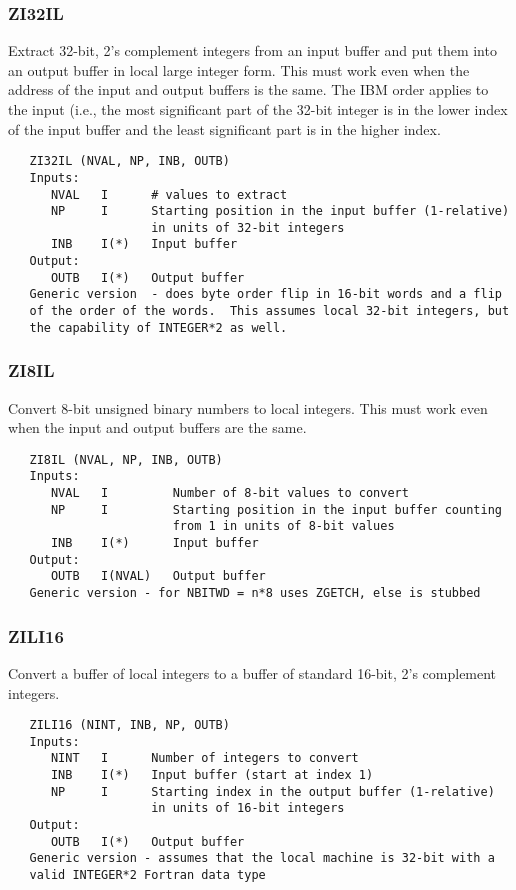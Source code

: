 \subsubsection{ZI32IL}
Extract 32-bit, 2's complement integers from an input buffer and put
them into an output buffer in local large integer form.  This must
work even when the address of the input and output buffers is the
same.  The IBM order applies to the input (i.e., the most
significant part of the 32-bit integer is in the lower index of the
input buffer and the least significant part is in the higher index.
\begin{verbatim}
   ZI32IL (NVAL, NP, INB, OUTB)
   Inputs:
      NVAL   I      # values to extract
      NP     I      Starting position in the input buffer (1-relative)
                    in units of 32-bit integers
      INB    I(*)   Input buffer
   Output:
      OUTB   I(*)   Output buffer
   Generic version  - does byte order flip in 16-bit words and a flip
   of the order of the words.  This assumes local 32-bit integers, but
   the capability of INTEGER*2 as well.
\end{verbatim}

\subsubsection{ZI8IL}
Convert 8-bit unsigned binary numbers to local integers.  This must
work even when the input and output buffers are the same.
\begin{verbatim}
   ZI8IL (NVAL, NP, INB, OUTB)
   Inputs:
      NVAL   I         Number of 8-bit values to convert
      NP     I         Starting position in the input buffer counting
                       from 1 in units of 8-bit values
      INB    I(*)      Input buffer
   Output:
      OUTB   I(NVAL)   Output buffer
   Generic version - for NBITWD = n*8 uses ZGETCH, else is stubbed
\end{verbatim}

\subsubsection{ZILI16}
Convert a buffer of local integers to a buffer of standard 16-bit,
2's complement integers.
\begin{verbatim}
   ZILI16 (NINT, INB, NP, OUTB)
   Inputs:
      NINT   I      Number of integers to convert
      INB    I(*)   Input buffer (start at index 1)
      NP     I      Starting index in the output buffer (1-relative)
                    in units of 16-bit integers
   Output:
      OUTB   I(*)   Output buffer
   Generic version - assumes that the local machine is 32-bit with a
   valid INTEGER*2 Fortran data type
\end{verbatim}

